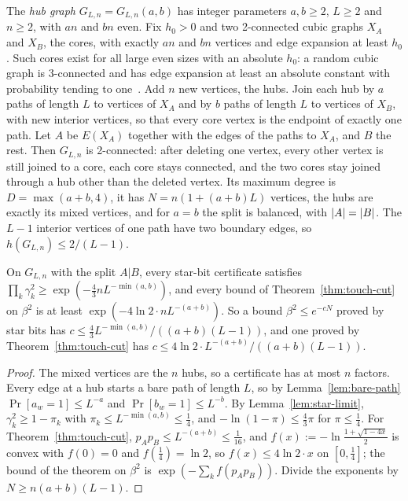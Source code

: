 The \emph{hub graph} $G_{L,n}=G_{L,n}(a,b)$ has integer parameters $a,b\ge2$, $L\ge2$ and $n\ge2$, with $an$ and $bn$ even. Fix $h_0>0$ and two 2-connected cubic graphs $X_A$ and $X_B$, the cores, with exactly $an$ and $bn$ vertices and edge expansion at least $h_0$. Such cores exist for all large even sizes with an absolute $h_0$: a random cubic graph is 3-connected and has edge expansion at least an absolute constant with probability tending to one~\cite{Wormald81,Bollobas88}. Add $n$ new vertices, the hubs. Join each hub by $a$ paths of length $L$ to vertices of $X_A$ and by $b$ paths of length $L$ to vertices of $X_B$, with new interior vertices, so that every core vertex is the endpoint of exactly one path. Let $A$ be $E(X_A)$ together with the edges of the paths to $X_A$, and $B$ the rest. Then $G_{L,n}$ is 2-connected: after deleting one vertex, every other vertex is still joined to a core, each core stays connected, and the two cores stay joined through a hub other than the deleted vertex. Its maximum degree is $D=\max(a+b,4)$, it has $N=n(1+(a+b)L)$ vertices, the hubs are exactly its mixed vertices, and for $a=b$ the split is balanced, with $\lvert A\rvert=\lvert B\rvert$. The $L-1$ interior vertices of one path have two boundary edges, so $h(G_{L,n})\le2/(L-1)$.

\begin{proposition}\label{prop:hub}
On $G_{L,n}$ with the split $A|B$, every star-bit certificate satisfies $\prod_k\gamma_k^2\ge\exp(-\frac43nL^{-\min(a,b)})$, and every bound of Theorem~\ref{thm:touch-cut} on $\beta^2$ is at least $\exp(-4\ln2\cdot nL^{-(a+b)})$. So a bound $\beta^2\le e^{-cN}$ proved by star bits has $c\le\frac43L^{-\min(a,b)}/((a+b)(L-1))$, and one proved by Theorem~\ref{thm:touch-cut} has $c\le4\ln2\cdot L^{-(a+b)}/((a+b)(L-1))$.
\end{proposition}

\begin{proof}
The mixed vertices are the $n$ hubs, so a certificate has at most $n$ factors. Every edge at a hub starts a bare path of length $L$, so by Lemma~\ref{lem:bare-path} $\Pr[a_w=1]\le L^{-a}$ and $\Pr[b_w=1]\le L^{-b}$. By Lemma~\ref{lem:star-limit}, $\gamma_k^2\ge1-\pi_k$ with $\pi_k\le L^{-\min(a,b)}\le\frac14$, and $-\ln(1-\pi)\le\frac43\pi$ for $\pi\le\frac14$. For Theorem~\ref{thm:touch-cut}, $p_Ap_B\le L^{-(a+b)}\le\frac1{16}$, and $f(x):=-\ln\frac{1+\sqrt{1-4x}}2$ is convex with $f(0)=0$ and $f(\frac14)=\ln2$, so $f(x)\le4\ln2\cdot x$ on $[0,\frac14]$; the bound of the theorem on $\beta^2$ is $\exp(-\sum_kf(p_Ap_B))$. Divide the exponents by $N\ge n(a+b)(L-1)$.
\end{proof}

